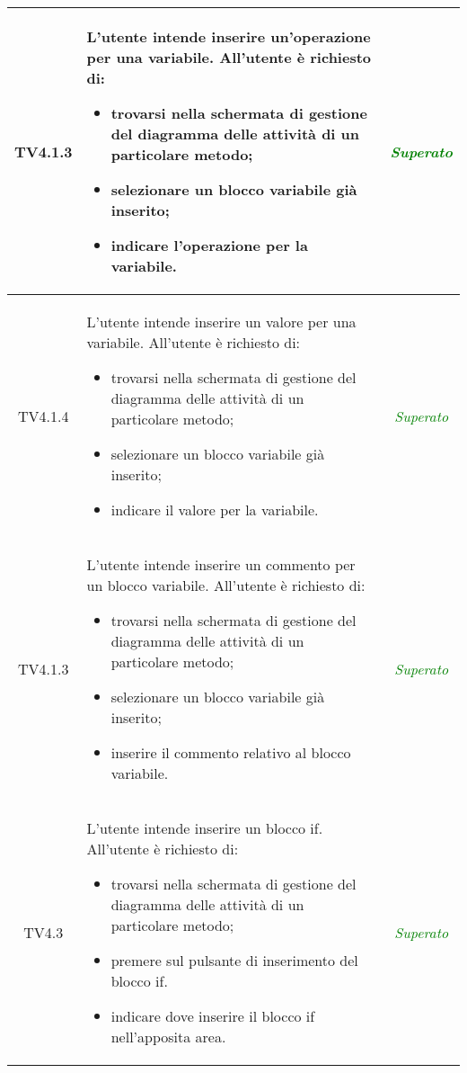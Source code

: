 \begin{longtable}{|c|>{}m{8cm}|c|}
\hypertarget{TV4.1.3}{TV4.1.3} & L'utente intende inserire un'operazione per una variabile.
All'utente è richiesto di:
\begin{itemize}
	\item trovarsi nella schermata di gestione del diagramma delle attività di un particolare metodo;
	\item selezionare un blocco variabile già inserito;
	\item indicare l'operazione per la variabile.
\end{itemize} & \textcolor{Green}{\textit{Superato}}\\ \hline

\hypertarget{TV4.1.4}{TV4.1.4} & L'utente intende inserire un valore per una variabile.
All'utente è richiesto di:
\begin{itemize}
	\item trovarsi nella schermata di gestione del diagramma delle attività di un particolare metodo;
	\item selezionare un blocco variabile già inserito;
	\item indicare il valore per la variabile.
\end{itemize} & \textcolor{Green}{\textit{Superato}}\\ \hline


\hypertarget{TV4.1.3}{TV4.1.3} & L'utente intende inserire un commento per un blocco variabile.
All'utente è richiesto di:
\begin{itemize}
	\item trovarsi nella schermata di gestione del diagramma delle attività di un particolare metodo;
	\item selezionare un blocco variabile già inserito;
	\item inserire il commento relativo al blocco variabile.
\end{itemize} & \textcolor{Green}{\textit{Superato}}\\ \hline

\hypertarget{TV4.3}{TV4.3} & L'utente intende inserire un blocco if.
All'utente è richiesto di:
\begin{itemize}
	\item trovarsi nella schermata di gestione del diagramma delle attività di un particolare metodo;
	\item premere sul pulsante di inserimento del blocco if.
	\item indicare dove inserire il blocco if nell'apposita area.
\end{itemize} & \textcolor{Green}{\textit{Superato}}\\ \hline


\end{longtable}
